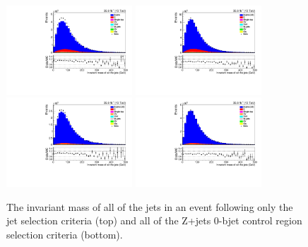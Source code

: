 \begin{figure}[ht]
\centering
\includegraphics[width=0.42\textwidth]{figs/background-estimation/plots/unblinded/DY_control_old_prompt_ee_ttbarInc/totalJetMass_SingleTop_jetSel_ee.pdf}
\includegraphics[width=0.42\textwidth]{figs/background-estimation/plots/unblinded/DY_control_old_prompt_mumu_ttbarInc/totalJetMass_SingleTop_jetSel_mumu.pdf}
\\
\includegraphics[width=0.42\textwidth]{figs/background-estimation/plots/unblinded/DY_control_old_prompt_ee_ttbarInc/totalJetMass_SingleTop_wMass_ee.pdf}
\includegraphics[width=0.42\textwidth]{figs/background-estimation/plots/unblinded/DY_control_old_prompt_mumu_ttbarInc/totalJetMass_SingleTop_wMass_mumu.pdf}
\caption{
The invariant mass of all of the jets in an event following only the jet selection criteria (top) and all of the Z+jets 0-bjet control region selection criteria (bottom).
}
\label{fig:App_CR_LO_totalJetMass}
\end{figure}


